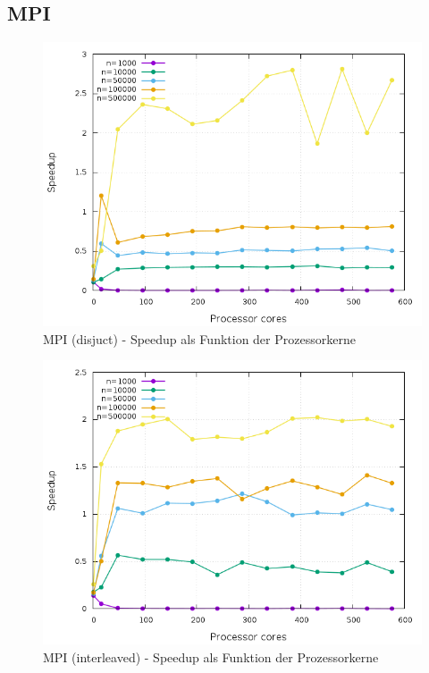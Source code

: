 \subsection{MPI}

\begin{figure}[htbp]
	\centering
	\includegraphics[width=404pt]{resources/plots/MPI_Disjunct_sizes.png}
	\caption{MPI (disjuct) - Speedup als Funktion der Prozessorkerne}
	\label{MPI_Disjunct_sizes}
\end{figure}


\begin{figure}[htbp]
	\centering
	\includegraphics[width=404pt]{resources/plots/MPI_Interleaved_sizes.png}
	\caption{MPI (interleaved) - Speedup als Funktion der Prozessorkerne}
	\label{MPI_Interleaved_sizes}
\end{figure}


